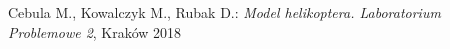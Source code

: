 \begin{thebibliography}{}
	
	
	Cebula M., Kowalczyk M., Rubak D.: 
	\emph{Model helikoptera. Laboratorium Problemowe 2}, Kraków 2018
	

	
\end{thebibliography}